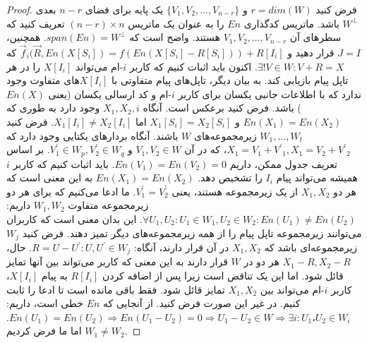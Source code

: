 \begin{proof}
    فرض کنید $r = dim(W)$ و $\{V_1, V_2, \ldots, V_{n - r} \}$ یک پایه برای فضای $n - r$ بعدی $W^\bot$ باشد. ماتریس کدگذاری $En$ را به عنوان یک ماتریس $(n - r) \times n $ تعریف کنید که سطرهای آن $V_1, V_2, \ldots, V_{n - r}$ هستند. واضح است که $span(En) = W^\bot$. همچنین، $J = I$ قرار دهید و $\overrightarrow{f}_i(\overrightarrow{R}, En(X[S_i]) = f(En(X[S_i] - R[S_i])) + R[I_i]$ که $\exists! V \in W: V + R = X $.
    اکنون باید اثبات کنیم که کاربر $i$-ام می‌تواند $X[I_i]$ را در هر تاپل پیام بازیابی کند. به بیان دیگر، تاپل‌های پیام متفاوتی با $X[I_i]$‌های متفاوت وجود ندارد که با اطلاعات جانبی یکسان برای کاربر $i$-ام و کد ارسالی یکسان (یعنی $En(X)$) باشد. فرض کنید برعکس است. آنگاه $X_1, X_2, i$ وجود دارد به طوری که $En(X_1) = En(X_2)$ و $X_1[S_i] = X_2[S_i]$ اما $X_1[I_i] \neq X_2[I_i]$. فرض کنید $W_1, \ldots, W_t$ زیرمجموعه‌های $W$ باشند. آنگاه بردارهای یکتایی وجود دارد که $X_1 = V_1 + {V^\prime}_1, X_1 = V_2 + {V^\prime}_2$، که در آن $V_1, V_2 \in W$ و $V^\prime_1 \in W_p, V^\prime_2 \in W_q$.
    بر اساس تعریف جدول ممکن، داریم $En(V_1) = En(V_2) = 0$.
    باید اثبات کنیم که کاربر $i$ همیشه می‌تواند پیام $I_i$ را تشخیص دهد. $En(X_1) = En(X_2)$ به این معنی است که هر دو $X_1, X_2$ از یک زیرمجموعه هستند، یعنی $V^\prime_1 = V^\prime_2$. ما ادعا می‌کنیم که برای هر دو زیرمجموعه متفاوت $W_1, W_2$ داریم: $\forall U_1, U_2: U_1 \in W_1, U_2 \in W_2: En(U_1) \neq En(U_2)$. این بدان معنی است که کاربران می‌توانند زیرمجموعه تاپل پیام را از همه زیرمجموعه‌های دیگر تمیز دهند. فرض کنید $W_j$ زیرمجموعه‌ای باشد که $X_1, X_2$ در آن قرار دارند، آنگاه: $R = U - U^\prime: U, U^\prime \in W_j$. حال، $X_1 - R, X_2 - R$ هر دو در $W$ قرار دارند به این معنی که کاربر می‌تواند بین آنها تمایز قائل شود. اما این یک تناقض است زیرا پس از اضافه کردن $R[I_i]$ به پیام $X[I_i]$، کاربر $i$-ام می‌تواند بین $X_1, X_2$ تمایز قائل شود.
    فقط باقی مانده است تا ادعا را ثابت کنیم. در غیر این صورت فرض کنید. از آنجایی که $En$ خطی است، داریم: $En(U_1) = En(U_2) \Rightarrow En(U_1 - U_2) = 0 \Rightarrow U_1 - U_2 \in W \Rightarrow \exists i: U_1، U_2 \in W_i$. اما ما فرض کردیم $W_1 \neq W_2$.
\end{proof}

